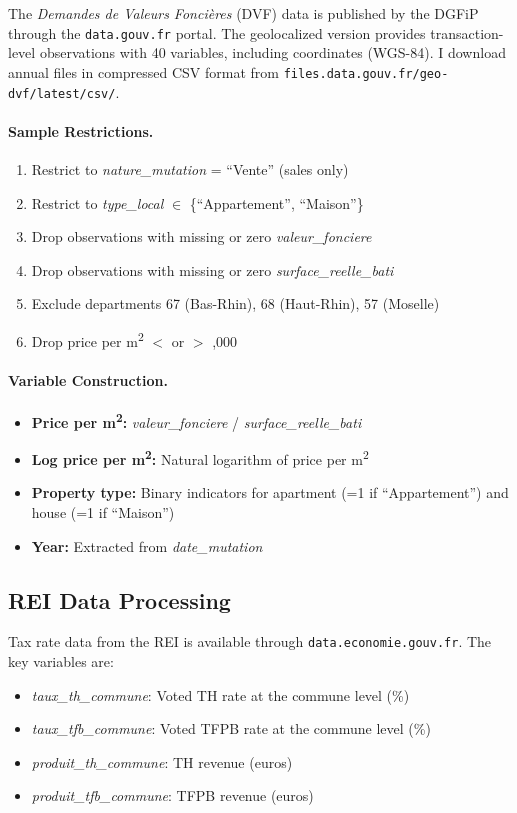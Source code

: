 \documentclass[12pt]{article}
\begin{document}
The \emph{Demandes de Valeurs Fonci\`eres} (DVF) data is published by the DGFiP through the \texttt{data.gouv.fr} portal. The geolocalized version provides transaction-level observations with 40 variables, including coordinates (WGS-84). I download annual files in compressed CSV format from \texttt{files.data.gouv.fr/geo-dvf/latest/csv/}.

\paragraph{Sample Restrictions.}
\begin{enumerate}
    \item Restrict to \emph{nature\_mutation} = ``Vente'' (sales only)
    \item Restrict to \emph{type\_local} $\in$ \{``Appartement'', ``Maison''\}
    \item Drop observations with missing or zero \emph{valeur\_fonciere}
    \item Drop observations with missing or zero \emph{surface\_reelle\_bati}
    \item Exclude departments 67 (Bas-Rhin), 68 (Haut-Rhin), 57 (Moselle)
    \item Drop price per m\textsuperscript{2} $<$  or $>$ ,000
\end{enumerate}

\paragraph{Variable Construction.}
\begin{itemize}
    \item \textbf{Price per m\textsuperscript{2}:} \emph{valeur\_fonciere} / \emph{surface\_reelle\_bati}
    \item \textbf{Log price per m\textsuperscript{2}:} Natural logarithm of price per m\textsuperscript{2}
    \item \textbf{Property type:} Binary indicators for apartment (=1 if ``Appartement'') and house (=1 if ``Maison'')
    \item \textbf{Year:} Extracted from \emph{date\_mutation}
\end{itemize}

\subsection{REI Data Processing}

Tax rate data from the REI is available through \texttt{data.economie.gouv.fr}. The key variables are:
\begin{itemize}
    \item \emph{taux\_th\_commune}: Voted TH rate at the commune level (\%)
    \item \emph{taux\_tfb\_commune}: Voted TFPB rate at the commune level (\%)
    \item \emph{produit\_th\_commune}: TH revenue (euros)
    \item \emph{produit\_tfb\_commune}: TFPB revenue (euros)
\end{itemize}
\end{document}
